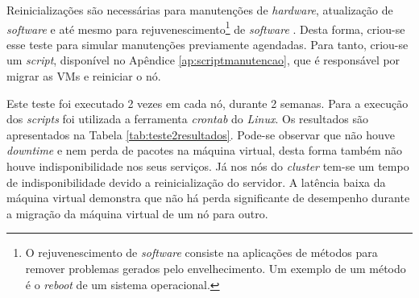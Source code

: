 Reinicializações são necessárias para manutenções de \textit{hardware}, atualização de \textit{software} e até mesmo para 
rejuvenescimento\footnote{O rejuvenescimento de \textit{software} consiste na aplicações de métodos para remover problemas gerados pelo 
envelhecimento. Um exemplo de um método é o \textit{reboot} de um sistema operacional.} 
de \textit{software} \cite{melo2014}. Desta forma, criou-se esse teste para simular manutenções previamente agendadas. Para tanto, criou-se 
um \textit{script}, disponível no Apêndice \ref{ap:scriptmanutencao}, que é responsável por migrar as \acp{VM} e reiniciar o nó.


Este teste foi executado 2 vezes em cada nó, durante 2 semanas. Para a execução dos \textit{scripts} foi utilizada a ferramenta 
\textit{crontab} do \textit{Linux}. Os resultados são apresentados na Tabela \ref{tab:teste2resultados}.
Pode-se observar que não houve \textit{downtime} e nem perda de pacotes na máquina virtual, desta forma também não houve indisponibilidade nos 
seus serviços. Já nos nós do \textit{cluster} tem-se um tempo de indisponibilidade devido a reinicialização do servidor.
A latência baixa da máquina virtual demonstra que não há perda significante de desempenho durante a migração da máquina virtual de um nó para outro.


